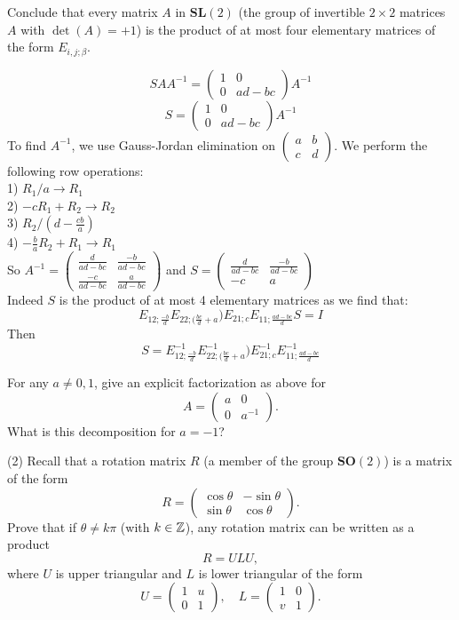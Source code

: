 \documentclass[12pt]{article}
\begin{document}
\medskip
Conclude that every matrix $A$ in $\mathbf{SL}(2)$ 
(the group of invertible $2\times 2$ matrices $A$ with
$\det(A) = +1$)  is the product of
at most four elementary matrices
of the form $E_{i, j; \beta}$.

$$ S A A^{-1} = \begin{pmatrix}
1 & 0 \\ 0 & ad - bc
\end{pmatrix}A^{-1}$$
$$ S = \begin{pmatrix}
1 & 0 \\ 0 & ad - bc
\end{pmatrix}A^{-1}$$
To find $A^{-1}$, we use Gauss-Jordan elimination on $\begin{pmatrix}
a & b \\ c & d
\end{pmatrix}$.
We perform the following row operations:\\
1) $R_1/a \rightarrow R_1$\\
2) $-cR_1 + R_2 \rightarrow R_2$\\
3) $R_2/(d - \frac{cb}{a}) $\\
4) $-\frac{b}{a}R_2 + R_1 \rightarrow R_1$\\ 
So $A^{-1} = \begin{pmatrix}
\frac{d}{ad - bc} & \frac{-b}{ad - bc}\\
\frac{-c}{ad - bc} & \frac{a}{ad - bc}
\end{pmatrix}$ and $S = \begin{pmatrix}
\frac{d}{ad - bc} & \frac{-b}{ad - bc}\\
-c & a
\end{pmatrix}$
\\ 
Indeed $S$ is the product of at most 4 elementary matrices as we find that:
$$E_{12;\frac{-b}{d}}E_{22;(\frac{bc}{d} +a})E_{21;c}E_{11;\frac{ad - bc}{d}}S = I$$
Then $$ S = E^{-1}_{12;\frac{-b}{d}}E^{-1}_{22;(\frac{bc}{d} +a})E^{-1}_{21;c}E^{-1}_{11;\frac{ad - bc}{d}}$$

\medskip
For any $a\not= 0, 1$, give an explicit factorization as above for
\[
A = 
\begin{pmatrix}
a & 0 \\
0 & a^{-1}
\end{pmatrix}.
\]
What is this decomposition for $a = -1$?

\medskip
(2)
Recall that a rotation matrix $R$ (a member of the group
$\mathbf{SO}(2)$)  is a matrix of the form
\[
R = 
\begin{pmatrix}
\cos\theta & -\sin\theta \\
\sin\theta & \cos\theta
\end{pmatrix}.
\]
Prove that if $\theta \not= k \pi$ (with $k \in {\mathbb Z}$), 
any rotation matrix can be written as a product 
\[
R = U L U,
\] 
where $U$ is upper triangular and $L$ is lower triangular 
of the form
\[
U = 
\begin{pmatrix}
1 & u \\
0 & 1
\end{pmatrix},
\quad
L = 
\begin{pmatrix}
1 & 0 \\
v & 1
\end{pmatrix}.
\]
\end{document}
